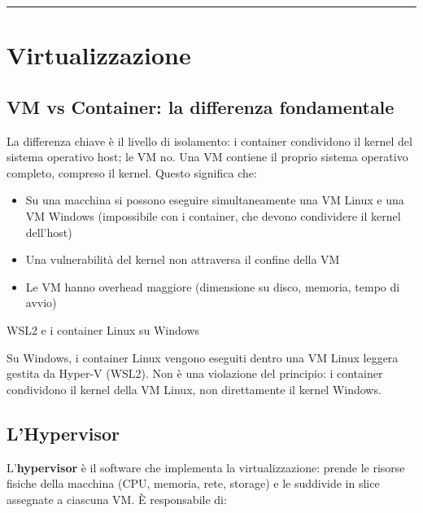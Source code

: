 \documentclass[
  italian,
  openany]{book}
\providecommand{\tightlist}{%
  \setlength{\itemsep}{0pt}\setlength{\parskip}{0pt}}
\begin{document}
\begin{center}\rule{0.5\linewidth}{0.5pt}\end{center}

\section{Virtualizzazione}\label{virtualizzazione}

\subsection{VM vs Container: la differenza
fondamentale}\label{vm-vs-container-la-differenza-fondamentale}

La differenza chiave è il livello di isolamento: i container condividono
il kernel del sistema operativo host; le VM no. Una VM contiene il
proprio sistema operativo completo, compreso il kernel. Questo significa
che:

\begin{itemize}
\tightlist
\item
  Su una macchina si possono eseguire simultaneamente una VM Linux e una
  VM Windows (impossibile con i container, che devono condividere il
  kernel dell'host)
\item
  Una vulnerabilità del kernel non attraversa il confine della VM
\item
  Le VM hanno overhead maggiore (dimensione su disco, memoria, tempo di
  avvio)
\end{itemize}

\begin{calloutnote}{WSL2 e i container Linux su Windows}

Su Windows, i container Linux vengono eseguiti dentro una VM Linux
leggera gestita da Hyper-V (WSL2). Non è una violazione del principio: i
container condividono il kernel della VM Linux, non direttamente il
kernel Windows.

\end{calloutnote}

\subsection{L'Hypervisor}\label{lhypervisor}

L'\textbf{hypervisor} è il software che implementa la virtualizzazione:
prende le risorse fisiche della macchina (CPU, memoria, rete, storage) e
le suddivide in slice assegnate a ciascuna VM. È responsabile di:
\end{document}
